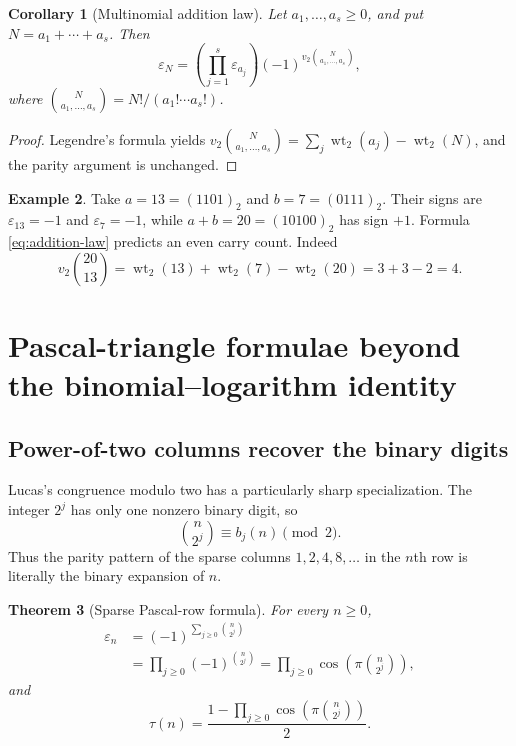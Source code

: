 \documentclass[11pt,oneside]{article}
\newtheorem{theorem}{Theorem}[section]
\newtheorem{corollary}[theorem]{Corollary}
\theoremstyle{definition}
\newtheorem{example}[theorem]{Example}
\theoremstyle{remark}
\newcommand{\wt}{\operatorname{wt}_2}
\newcommand{\vtwo}{v_2}
\begin{document}
\begin{corollary}[Multinomial addition law]
\label{cor:multinomial-addition}
Let \(a_1,\ldots,a_s\ge0\), and put \(N=a_1+\cdots+a_s\).  Then
\begin{equation}
 \varepsilon_N
 =\left(\prod_{j=1}^s\varepsilon_{a_j}\right)
  (-1)^{\vtwo\binom{N}{a_1,\ldots,a_s}},
 \label{eq:multinomial-addition}
\end{equation}
where \(\binom{N}{a_1,\ldots,a_s}=N!/(a_1!\cdots a_s!)\).
\end{corollary}

\begin{proof}
Legendre's formula yields
\(
 \vtwo\binom{N}{a_1,\ldots,a_s}
 =\sum_j\wt(a_j)-\wt(N)
\), and the parity argument is unchanged.
\end{proof}

\begin{example}
Take \(a=13=(1101)_2\) and \(b=7=(0111)_2\).  Their signs are
\(\varepsilon_{13}=-1\) and \(\varepsilon_7=-1\), while
\(a+b=20=(10100)_2\) has sign \(+1\).  Formula
\eqref{eq:addition-law} predicts an even carry count.  Indeed
\begin{equation*}
 \vtwo\binom{20}{13}
 =\wt(13)+\wt(7)-\wt(20)=3+3-2=4.
\end{equation*}
\end{example}

\section{Pascal-triangle formulae beyond the binomial--logarithm identity}
\label{sec:pascal}

\subsection{Power-of-two columns recover the binary digits}

Lucas's congruence modulo two has a particularly sharp specialization.  The
integer \(2^j\) has only one nonzero binary digit, so
\begin{equation}
 \binom{n}{2^j}\equiv b_j(n)\pmod2.
 \label{eq:power-two-column}
\end{equation}
Thus the parity pattern of the sparse columns
\(1,2,4,8,\ldots\) in the \(n\)th row is literally the binary expansion of
\(n\).

\begin{theorem}[Sparse Pascal-row formula]
\label{thm:sparse-pascal}
For every \(n\ge0\),
\begin{align}
 \varepsilon_n
 &=(-1)^{\sum_{j\ge0}\binom{n}{2^j}}
 \label{eq:sparse-pascal-exp}\\
 &=\prod_{j\ge0}(-1)^{\binom{n}{2^j}}
 =\prod_{j\ge0}\cos\!\left(\pi\binom{n}{2^j}\right),
 \label{eq:sparse-pascal-product}
\end{align}
and
\begin{equation}
 \tau(n)=\frac{1-\prod_{j\ge0}
          \cos\!\left(\pi\binom{n}{2^j}\right)}{2}.
 \label{eq:sparse-pascal-bit}
\end{equation}
\end{theorem}
\end{document}
